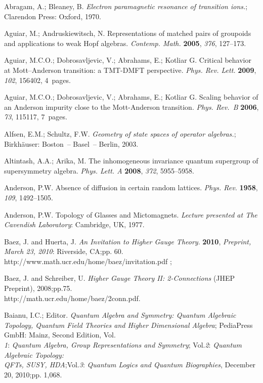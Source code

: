 \documentclass[12pt]{article}
\theoremstyle{plain}
\theoremstyle{definition}
\numberwithin{equation}{section}
\begin{document}
\begin{thebibliography}{99}

Abragam, A.; Bleaney, B.  \emph{Electron paramagnetic resonance of transition ions.}; Clarendon Press: Oxford, 1970.

Aguiar, M.; Andruskiewitsch, N.  Representations of matched pairs of groupoids and applications to weak Hopf algebras. {\it Contemp. Math.} {\bf 2005}, {\em 376}, 127--173.  


Aguiar, M.C.O.; Dobrosavljevic, V.; Abrahams, E.; Kotliar G.  Critical behavior at Mott--Anderson transition: a TMT-DMFT perspective. \emph{Phys. Rev. Lett.} {\bf 2009}, {\em 102}, 156402, 4~pages. 

Aguiar, M.C.O.; Dobrosavljevic, V.; Abrahams, E.; Kotliar G.  Scaling behavior of an Anderson impurity close to the Mott-Anderson transition. \textit{Phys. Rev.~B} {\bf 2006}, {\em 73}, 115117, 7~pages. 

Alfsen, E.M.; Schultz, F.W. {\em Geometry of state spaces of operator algebras.}; Birkh\"auser: Boston~-- Basel~-- Berlin, 2003.

Altintash, A.A.; Arika, M.  The inhomogeneous invariance quantum supergroup of supersymmetry algebra. \textit{Phys. Lett. A} {\bf 2008}, {\em 372}, 5955--5958.

Anderson, P.W.  Absence of diffusion in certain random lattices. \textit{Phys. Rev.} {\bf 1958}, {\em 109}, 1492--1505.

Anderson, P.W. Topology of Glasses and Mictomagnets. {\em  Lecture presented at The Cavendish Laboratory}: Cambridge, UK, 1977.

Baez, J. and  Huerta, J.  {\em An Invitation to Higher Gauge Theory}. {\bf 2010}, {\em Preprint, March 23, 2010}: Riverside, CA;pp. 60.  http://www.math.ucr.edu/home/baez/invitation.pdf 
; 


Baez, J. and  Schreiber, U. {\em  Higher Gauge Theory II: 2-Connections} (JHEP Preprint), 2008;pp.75. \\
 http://math.ucr.edu/home/baez/2conn.pdf.

Baianu, I.C.; Editor. {\em Quantum Algebra and Symmetry: Quantum Algebraic Topology, Quantum Field Theories and Higher Dimensional Algebra}; PediaPress GmbH: Mainz, Second Edition, Vol. \\{\em 1}: {\em Quantum Algebra, Group Representations and Symmetry}; Vol.{\em 2}: {\em Quantum Algebraic Topology: \\ QFTs, SUSY, HDA};Vol.{\em 3}: {\em Quantum Logics and Quantum Biographies}, December 20, 2010;pp. 1,068.


\end{thebibliography}
\end{document}
